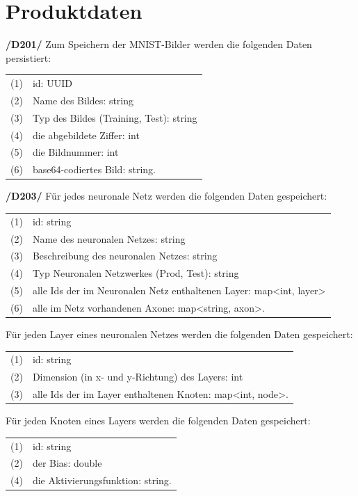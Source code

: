 \section{Produktdaten}

\textbf{/D201/} Zum Speichern der MNIST-Bilder werden die folgenden Daten persistiert:

\begin{tabular}{cl}
(1) & id: UUID \\[0.2cm]
(2) & Name des Bildes: string\\[0.2cm]
(3) & Typ des Bildes (Training, Test): string\\[0.2cm]
(4) & die abgebildete Ziffer: int\\[0.2cm]
(5) & die Bildnummer: int\\[0.2cm]
(6) & base64-codiertes Bild: string.\\[0.2cm]  
\end{tabular}

\textbf{/D203/} Für jedes neuronale Netz werden die folgenden Daten gespeichert: 

\begin{tabular}{cl}
(1) & id: string \\[0.2cm]
(2) & Name des neuronalen Netzes: string\\[0.2cm]
(3) & Beschreibung des neuronalen Netzes: string\\[0.2cm]
(4) & Typ Neuronalen Netzwerkes (Prod, Test): string \\[0.2cm]
(5) & alle Ids der im Neuronalen Netz enthaltenen Layer: map<int, layer>\\[0.2cm]
(6) & alle im Netz vorhandenen Axone: map<string, axon>.\\[0.2cm]
\end{tabular}

Für jeden Layer eines neuronalen Netzes werden die folgenden Daten gespeichert: 

\begin{tabular}{cl}
(1) & id: string \\[0.2cm]
(2) & Dimension (in x- und y-Richtung) des Layers: int \\[0.2cm]
(3) & alle Ids der im Layer enthaltenen Knoten: map<int, node>.\\[0.2cm]
\end{tabular}

Für jeden Knoten eines Layers werden die folgenden Daten gespeichert: 

\begin{tabular}{cl}
(1) & id: string \\[0.2cm]
(2) & der Bias: double \\[0.2cm]
(4) & die Aktivierungsfunktion: string.\\[0.2cm]
\end{tabular}

